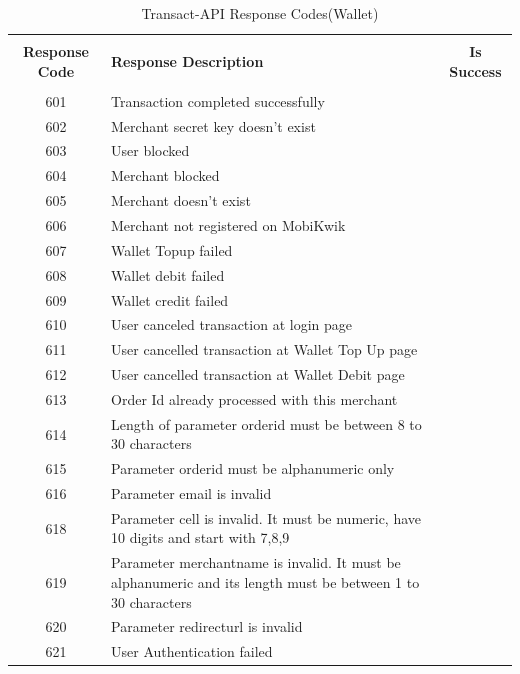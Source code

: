 \documentclass{article}
\newcommand{\cmark}{\ding{51}}
\newcommand{\xmark}{\ding{55}}
\begin{document}
\begin{longtable}{||c|p{12.5cm}||c||}
\rowcolor{white}
\caption{Transact-API Response Codes(Wallet)}\\
\rowcolor{green!50}
\bfseries{Response Code} & \bfseries{Response Description} & \bfseries{Is Success}\\ \hline & & \\
601 &Transaction completed successfully&\textcolor{green}{\cmark} \\
602 &Merchant secret key doesn’t exist& \textcolor{red} {\xmark}  \\
603 &User blocked& \textcolor{red} {\xmark} \\
604 &Merchant blocked& \textcolor{red} {\xmark}  \\
605 &Merchant doesn’t exist& \textcolor{red} {\xmark}  \\
606 &Merchant not registered on MobiKwik& \textcolor{red} {\xmark}  \\
607 &Wallet Topup failed& \textcolor{red} {\xmark}  \\
608 &Wallet debit failed& \textcolor{red} {\xmark}  \\
609 &Wallet credit failed& \textcolor{red} {\xmark}  \\
610 &User canceled transaction at login page& \textcolor{red} {\xmark}  \\
611 &User cancelled transaction at Wallet Top Up page& \textcolor{red} {\xmark}  \\
612 &User cancelled transaction at Wallet Debit page& \textcolor{red} {\xmark}  \\
613 &Order Id already processed with this merchant& \textcolor{red} {\xmark}  \\
614 &Length of parameter orderid must be between 8 to 30 characters& \textcolor{red} {\xmark}  \\
615 &Parameter orderid must be alphanumeric only& \textcolor{red} {\xmark}  \\
616 &Parameter email is invalid& \textcolor{red} {\xmark}  \\
618 &Parameter cell is invalid. It must be numeric, have 10 digits and start with 7,8,9& \textcolor{red} {\xmark}  \\
619 &Parameter merchantname is invalid. It must be alphanumeric and its length must be between 1 to 30 characters& \textcolor{red} {\xmark}  \\
620 &Parameter redirecturl is invalid& \textcolor{red} {\xmark}  \\
621 &User Authentication failed& \textcolor{red} {\xmark}  \\

\end{longtable}
\end{document}
